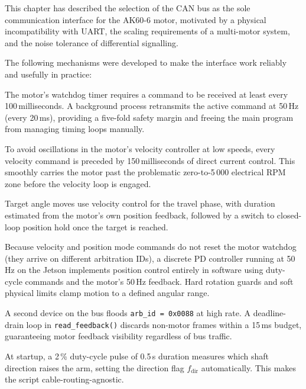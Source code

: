\documentclass[12pt,a4paper]{article}
\begin{document}
This chapter has described the selection of the CAN bus as the sole
communication interface for the AK60-6 motor, motivated by a physical
incompatibility with UART, the scaling requirements of a multi-motor
system, and the noise tolerance of differential signalling.

The following mechanisms were developed to make the interface work reliably
and usefully in practice:

\begin{description}[leftmargin=4.5cm, style=nextline]
  \item[Continuous refresh]
    The motor's watchdog timer requires a command to be received at
    least every 100\,milliseconds.  A background process retransmits the
    active command at 50\,Hz (every 20\,ms), providing a five-fold
    safety margin and freeing the main program from managing timing loops
    manually.

  \item[Soft-start]
    To avoid oscillations in the motor's velocity controller at low
    speeds, every velocity command is preceded by 150\,milliseconds of
    direct current control.  This smoothly carries the motor past the
    problematic zero-to-5\,000 electrical RPM zone before the velocity
    loop is engaged.

  \item[Two-phase position moves]
    Target angle moves use velocity control for the travel phase, with
    duration estimated from the motor's own position feedback, followed
    by a switch to closed-loop position hold once the target is reached.

  \item[Software PD position control]
    Because velocity and position mode commands do not reset the motor
    watchdog (they arrive on different arbitration IDs), a discrete PD
    controller running at 50\,Hz on the Jetson implements position
    control entirely in software using duty-cycle commands and the
    motor's 50\,Hz feedback.  Hard rotation guards and soft physical
    limits clamp motion to a defined angular range.

  \item[CAN noise drain]
    A second device on the bus floods \texttt{arb\_id = 0x0088} at
    high rate.  A deadline-drain loop in \texttt{read\_feedback()}
    discards non-motor frames within a 15\,ms budget, guaranteeing
    motor feedback visibility regardless of bus traffic.

  \item[Forward-direction detection]
    At startup, a 2\,\% duty-cycle pulse of 0.5\,s duration measures
    which shaft direction raises the arm, setting the direction flag
    $f_{\text{dir}}$ automatically.  This makes the script
    cable-routing-agnostic.


\end{description}
\end{document}
